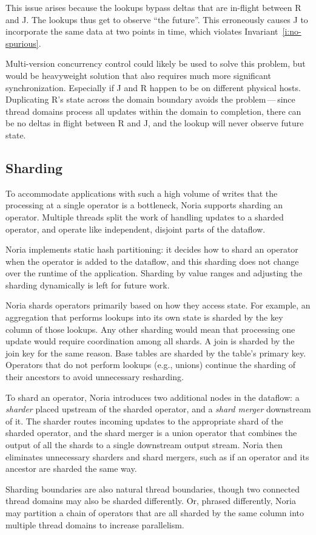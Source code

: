 This issue arises because the lookups bypass deltas that are in-flight between R
and J. The lookups thus get to observe ``the future''. This erroneously causes J
to incorporate the same data at two points in time, which violates
Invariant~\ref{i:no-spurious}.

Multi-version concurrency control could likely be used to solve this problem,
but would be heavyweight solution that also requires much more significant
synchronization. Especially if J and R happen to be on different physical hosts.
Duplicating R's state across the domain boundary avoids the problem\,---\,since
thread domains process all updates within the domain to completion, there can be
no deltas in flight between R and J, and the lookup will never observe future
state.

\subsection{Sharding}
\label{s:noria:sharding}

To accommodate applications with such a high volume of writes that the
processing at a single operator is a bottleneck, Noria supports sharding an
operator. Multiple threads split the work of handling updates to a sharded
operator, and operate like independent, disjoint parts of the dataflow.

Noria implements static hash partitioning: it decides how to shard an operator
when the operator is added to the dataflow, and this sharding does not change
over the runtime of the application. Sharding by value ranges and adjusting the
sharding dynamically is left for future work.

Noria shards operators primarily based on how they access state. For example, an
aggregation that performs lookups into its own state is sharded by the key
column of those lookups. Any other sharding would mean that processing one
update would require coordination among all shards. A join is sharded by the
join key for the same reason. Base tables are sharded by the table's primary
key. Operators that do not perform lookups (e.g., unions) continue the sharding
of their ancestors to avoid unnecessary resharding.

To shard an operator, Noria introduces two additional nodes in the dataflow: a
\emph{sharder} placed upstream of the sharded operator, and a \emph{shard
merger} downstream of it. The sharder routes incoming updates to the appropriate
shard of the sharded operator, and the shard merger is a union operator that
combines the output of all the shards to a single downstream output stream.
Noria then eliminates unnecessary sharders and shard mergers, such as if an
operator and its ancestor are sharded the same way.

Sharding boundaries are also natural thread boundaries, though two connected
thread domains may also be sharded differently. Or, phrased differently, Noria
may partition a chain of operators that are all sharded by the same column into
multiple thread domains to increase parallelism.

